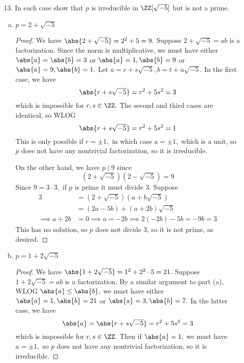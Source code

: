 \documentclass{article}
\begin{document}
\begin{itemize}
\begin{proof}
			If $n=p,$ then $a^2+b^2=1$ so either $a=\pm 1, b=0$ or $a=0, b=\pm 1.$ In either case, one of the two factors must be a unit. Thus, $p$ is irreducible in $\ZZ[i],$ as desired.
		\end{proof}

		\newpage
	\item[13.] In each case show that $p$ is irreducible in $\ZZ[\sqrt{-5}]$ but is not a prime.

		\begin{enumerate}[(a)]
			\item $p=2+\sqrt{-5}$
				\begin{proof}
					We have $\abs{2+\sqrt{-5}}=2^2+5=9.$ Suppose $2+\sqrt{-5}=ab$ is a factorization. Since the norm is multiplicative, we must have either $\abs{a}=\abs{b}=3$ or $\abs{a}=1, \abs{b}=9$ or $\abs{a}=9, \abs{b}=1.$ Let $a=r+s\sqrt{-5}, b=t+u\sqrt{-5}.$ In the first case, we have
					\[\abs{r+s\sqrt{-5}} = r^2+5s^2=3\]
					which is impossible for $r, s\in\ZZ.$ The second and third cases are identical, so WLOG
					\[\abs{r+s\sqrt{-5}} = r^2+5s^2=1\]
					This is only possible if $r=\pm 1,$ in which case $a=\pm 1,$ which is a unit, so $p$ does not have any nontrivial factorization, so it is irreducible. 

					On the other hand, we have $p\mid 9$ since
					\[\left( 2+\sqrt{-5} \right)\left( 2-\sqrt{-5} \right) = 9\]
					Since $9=3\cdot 3,$ if $p$ is prime it must divide 3. Suppose
					\begin{align*}
						3 &= \left( 2+\sqrt{-5} \right)\left( a+b\sqrt{-5} \right) \\
						&= (2a-5b) + (a+2b)\sqrt{-5} \\
						\implies a+2b&=0\implies a=-2b\implies 2(-2b)-5b=-9b=3
					\end{align*}
					This has no solution, so $p$ does not divide 3, so it is not prime, as desired.
				\end{proof}

			\item $p=1+2\sqrt{-5}$
				\begin{proof}
					We have $\abs{1+2\sqrt{-5}}=1^2+2^2\cdot 5 = 21.$ Suppose $1+2\sqrt{-5}=ab$ is a factorization. By a similar argument to part (a), WLOG $\abs{a}\le\abs{b},$ we must have either $\abs{a}=1, \abs{b}=21$ or $\abs{a}=3, \abs{b}=7.$ In the latter case, we have
					\[\abs{a}=\abs{r+s\sqrt{-5}}=r^2+5s^2=3\]
					which is impossible for $r, s\in\ZZ.$ Then if $\abs{a}=1,$ we must have $a=\pm 1,$ so $p$ does not have any nontrivial factorization, so it is irreducible.


\end{proof}
\end{enumerate}
\end{itemize}
\end{document}
